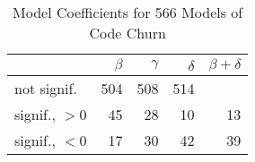 
\begin{table}[t] \centering
\small
  \caption{Model Coefficients for 566 Models of Code Churn}
  \label{Table:rddmodels}
\begin{tabular}{ l  r r r r }        
\hline 

 & $\beta$ & $\gamma$ & $\delta$ & $\beta + \delta$ \\ 
 \hline 
 \hline
not signif. & 504 & 508 & 514 & \\
\hline
signif., $>0$ & 45 & 28 & 10 & 13 \\
\hline
signif., $<0$ & 17 & 30 & 42 & 39 \\
\hline
\end{tabular}
\end{table}